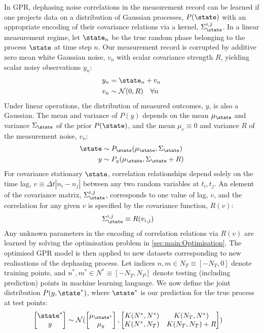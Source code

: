 In GPR, dephasing noise correlations in the measurement record can be learned if one projects data on a distribution of Gaussian processes, $P(\state)$ with an appropriate encoding of their covariance relations via a kernel, $\Sigma_\state^{i,j}$. In a linear measurement regime, let $\state_n$ be the true random phase belonging to the process $\state$ at time step $n$. Our measurement record is corrupted by additive zero mean white Gaussian noise, $v_n$ with scalar covariance strength $R$, yielding scalar noisy observations $y_n$:
\begin{align}
y_n &= \state_n + v_n \\
v_n & \sim \mathcal{N}(0, R) \quad \forall n
\end{align}
Under linear operations, the distribution of measured outcomes, $y$, is also a Gaussian. The  mean and variance of $P(y)$  depends on the mean $\mu_\state$ and variance $\Sigma_\state$ of the prior $P(\state)$, and the mean $\mu_v \equiv 0$ and variance $R$ of the measurement noise, $v_n$: 
\begin{align}
\state & \sim P_\state(\mu_\state,\Sigma_\state ) \\
y & \sim P_y(\mu_\state,\Sigma_\state + R ) 
\end{align}
For covariance stationary $\state$, correlation relationships depend solely on the time lag, $v \equiv \Delta t|n_i - n_j|$ between any two random variables at $t_i, t_j$.  An element of the covariance matrix, $\Sigma_\state^{i,j}$, corresponds to one value of lag, $v$, and the correlation for any given $v$  is specified by the covariance function, $R(v)$:
\begin{align}
\Sigma_\state^{i,j} & \equiv R(v_{i,j}) 
\end{align}
Any unknown parameters in the encoding of correlation relations via $R(v)$ are learned by solving the optimisation problem in \cref{sec:main:Optimisation}. The optimised GPR model is then applied to new datasets corresponding to new realisations of the dephasing process. Let indices $n,m \in N_T \equiv [-N_T, 0]$ denote training points, and $n^*,m^* \in N^* \equiv [-N_T, N_P]$ denote testing (including prediction) points in machine learning language. We now define the joint distribution $P(y,\state^*)$, where $\state^*$ is our prediction for the true process at test points: 
\begin{align}
\begin{bmatrix} \state^* \\y \end{bmatrix} & \sim \mathcal{N} (\begin{bmatrix} \mu_{\state^*} \\ \mu_y
\end{bmatrix} , \begin{bmatrix}   K(N^*,N^*)&K(N_T,N^*) \\ K(N^*,N_T) & K(N_T,N_T) + R \end{bmatrix} )
\end{align}

